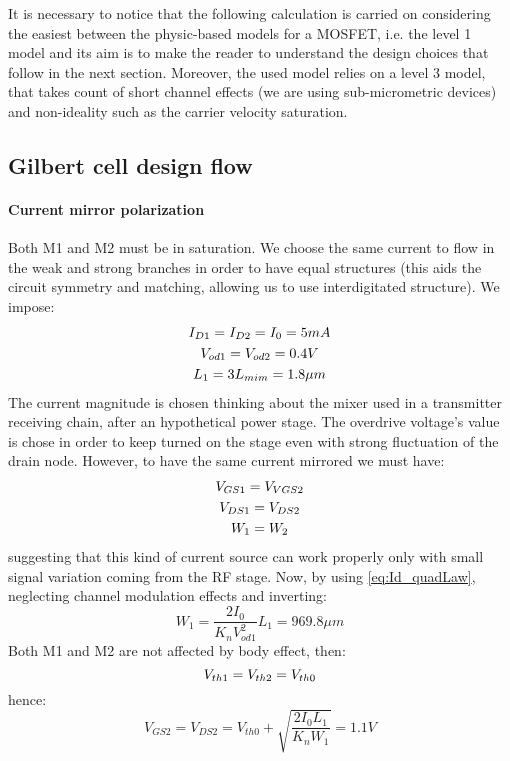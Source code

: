 It is necessary to notice that the following calculation is carried on considering the easiest between the physic-based models for a MOSFET, i.e. the level 1 model and its aim is to make the reader to understand the design choices that follow in the next section. Moreover, the used model relies on a level 3 model, that takes count of short channel effects (we are using sub-micrometric devices) and non-ideality such as the carrier velocity saturation. 

\subsection{Gilbert cell design flow} 

\paragraph{Current mirror polarization}

Both M1 and M2 must be in saturation. We choose the same current to flow in the weak and strong branches in order to have equal structures (this aids the circuit symmetry and matching, allowing us to use interdigitated structure). We impose:
\begin{gather}
I_{D1} = I_{D2} = I_0 = 5 mA \notag \\
V_{od1}=V_{od2}=0.4 V  \notag \\
L_1 =3 L_{mim} = 1.8 \mu m \notag
\end{gather} 
The current magnitude is chosen thinking about the mixer used in a transmitter receiving chain, after an hypothetical power stage. The overdrive voltage's value is chose in order to keep turned on the stage even with strong fluctuation of the drain node. However, to have the same current mirrored we must have:
\begin{gather}
	V_{GS1} = V_{VGS2} \notag \\
	V_{DS1} = V_{DS2} \notag \\
	W_1 = W_2 \notag \\
\end{gather}
suggesting that this kind of current source can work properly only with small signal variation coming from the RF stage. Now, by using \ref{eq:Id_quadLaw}, neglecting channel modulation effects and inverting:
\begin{equation}
W_1 = \frac{2I_0}{K_n V_{od1}^2}L_1 = 969.8 \mu m
\end{equation}
Both M1 and M2 are not affected by body effect, then:
\begin{equation}
	V_{th1}=V_{th2}=V_{th0} \notag \\
\end{equation}
hence:
\begin{equation}
V_{GS2}=V_{DS2}= V_{th0}+\sqrt{\frac{2I_0L_1}{K_n W_1 }} = 1.1 V
\end{equation}

